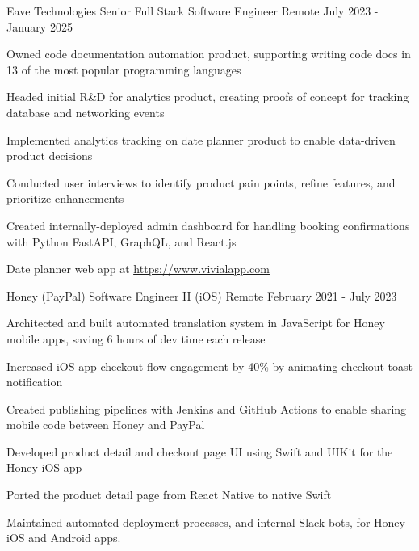 \documentclass[11pt, a4paper]{awesome-cv}
\begin{document}
\makecvheader


\begin{cventries}


  \cventry
    {Eave Technologies}
    {Senior Full Stack Software Engineer}
    {Remote}
    {July 2023 - January 2025}
    {
      \begin{cvitems}
        \item{Owned code documentation automation product, supporting writing code docs in 13 of the most popular programming languages}
        \item{Headed initial R\&D for analytics product, creating proofs of concept for tracking database and networking events}
        \item{Implemented analytics tracking on date planner product to enable data-driven product decisions}
        \item{Conducted user interviews to identify product pain points, refine features, and prioritize enhancements}
        \item{Created internally-deployed admin dashboard for handling booking confirmations with Python FastAPI, GraphQL, and React.js}
        \item{Date planner web app at \underline{\href{https://www.vivialapp.com}{https://www.vivialapp.com}}}
      \end{cvitems}
    }

  \cventry
    {Honey (PayPal)}
    {Software Engineer II (iOS)}
    {Remote}
    {February 2021 - July 2023}
    {
        \begin{cvitems}
            \item {Architected and built automated translation system in JavaScript for Honey mobile apps, saving 6 hours of dev time each release}
            \item {Increased iOS app checkout flow engagement by 40\% by animating checkout toast notification}
            \item {Created publishing pipelines with Jenkins and GitHub Actions to enable sharing mobile code between Honey and PayPal}
            \item {Developed product detail and checkout page UI using Swift and UIKit for the Honey iOS app}
            \item {Ported the product detail page from React Native to native Swift}
            \item {Maintained automated deployment processes, and internal Slack bots, for Honey iOS and Android apps.}
        \end{cvitems}
    }


\end{cventries}
\end{document}
